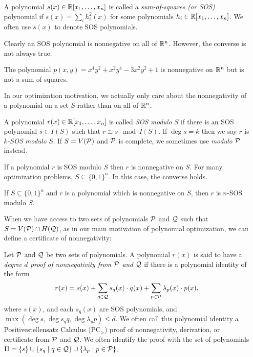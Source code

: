 \begin{definition}
A polynomial $s(x) \in \mathbb R[x_1,\dots,x_n]$ is called a \emph{sum-of-squares (or SOS)} polynomial if $s(x) = \sum_i h_i^2(x)$ for some polynomials $h_i \in \mathbb R[x_1,\dots,x_n]$. We often use $s(x)$ to denote SOS polynomials. 
\end{definition}

Clearly an SOS polynomial is nonnegative on all of $\mathbb R^n$. However, the converse is not always true.
\begin{fact}
The polynomial $p(x,y) = x^4y^2 + x^2y^4 - 3x^2y^2 + 1$ is nonnegative on $\mathbb R^n$ but is not a sum of squares.
\end{fact}

In our optimization motivation, we actually only care about the nonnegativity of a polynomial on a set $S$ rather than on all of $\mathbb R^n$. 

\begin{definition}
A polynomial $r(x) \in \mathbb R[x_1,\dots,x_n]$ is called \emph{SOS modulo $S$} if there is an SOS polynomial $s \in I(S)$ such that $r \cong s \mod I(S)$. If $\deg s = k$ then we say $r$ is \emph{$k$-SOS modulo $S$}. If $S = V(\mathcal P)$ and $\mathcal P$ is complete, we sometimes use \emph{modulo $\mathcal P$} instead.
\end{definition}
If a polynomial $r$ is SOS modulo $S$ then $r$ is nonnegative on $S$. For many optimization problems, $S \subseteq \{0,1\}^n$. In this case, the converse holds.
\begin{fact}\label{fact:boolSOS}
If $S \subseteq \{0,1\}^n$ and $r$ is a polynomial which is nonnegative on $S$, then $r$ is $n$-SOS modulo $S$. 
\end{fact}

When we have access to two sets of polynomials $\mathcal P$ and $\mathcal Q$ such that $S = V(\mathcal P) \cap H(\mathcal Q)$, as in our main motivation of polynomial optimization, we can define a certificate of nonnegativity:

\begin{definition}
Let $\mathcal P$ and $\mathcal Q$ be two sets of polynomials. A polynomial $r(x)$ is said to have a \emph{degree $d$ proof of nonnegativity from $\mathcal P$ and $\mathcal Q$} if there is a polynomial identity of the form
\[r(x) = s(x) + \sum_{q \in \mathcal Q} s_q(x) \cdot q(x) + \sum_{p \in \mathcal P} \lambda_p(x) \cdot p(x),\]
where $s(x)$, and each $s_q(x)$ are SOS polynomials, and $\max(\deg s, \deg s_qq, \deg \lambda_pp) \leq d$. We often call this polynomial identity a Positivestellensatz Calculus (PC$_>$) proof of nonnegativity, derivation, or certificate from $\mathcal P$ and $\mathcal Q$.
We often identify the proof with the set of polynomials $\Pi = \{s\} \cup \{s_q \mid q\in \mathcal Q\} \cup \{\lambda_p \mid p \in \mathcal P\}$.

\end{definition}

